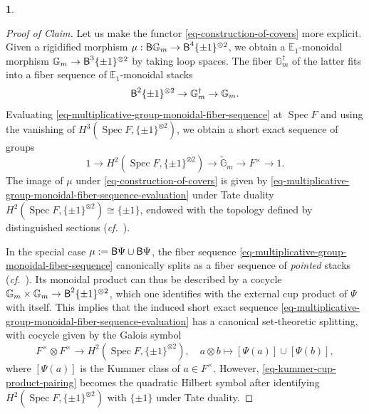 \documentclass[10pt,english,reqno]{amsart}
\newcommand{\deloop}{\textnormal{\textsf{B}}}
\newcommand{\Spec}{\operatorname{Spec}}
\theoremstyle{definition}
\numberwithin{equation}{section}
\newtheorem{untitledsubsubsection}[subsubsection]{}
\newenvironment{void}
{\begin{untitledsubsubsection}}
{\end{untitledsubsubsection}}
\begin{document}
\begin{void}
\begin{proof}[Proof of Claim]
Let us make the functor \eqref{eq-construction-of-covers} more explicit. Given a rigidified morphism $\mu : \deloop \mathbb G_m \rightarrow \deloop^4\{\pm 1\}^{\otimes 2}$, we obtain a $\mathbb E_1$-monoidal morphism $\mathbb G_m \rightarrow \deloop^3\{\pm 1\}^{\otimes 2}$ by taking loop spaces. The fiber $\mathbb G_m^{\dagger}$ of the latter fits into a fiber sequence of $\mathbb E_1$-monoidal stacks
\begin{equation}
\label{eq-multiplicative-group-monoidal-fiber-sequence}
\deloop^2\{\pm 1\}^{\otimes 2} \rightarrow \mathbb G_m^{\dagger} \rightarrow \mathbb G_m.
\end{equation}
Evaluating \eqref{eq-multiplicative-group-monoidal-fiber-sequence} at $\Spec F$ and using the vanishing of $H^3(\Spec F, \{\pm 1\}^{\otimes 2})$, we obtain a short exact sequence of groups
\begin{equation}
\label{eq-multiplicative-group-monoidal-fiber-sequence-evaluation}
1\rightarrow H^2(\Spec F, \{\pm 1\}^{\otimes 2}) \rightarrow \widetilde{\mathbb G}_m \rightarrow F^{\times} \rightarrow 1.
\end{equation}
The image of $\mu$ under \eqref{eq-construction-of-covers} is given by \eqref{eq-multiplicative-group-monoidal-fiber-sequence-evaluation} under Tate duality $H^2(\Spec F, \{\pm 1\}^{\otimes 2}) \cong \{\pm 1\}$, endowed with the topology defined by distinguished sections (\emph{cf.}~\cite[\S2.1.4]{zhao2022metaplectic}).

In the special case $\mu := \deloop\Psi\cup \deloop\Psi$, the fiber sequence \eqref{eq-multiplicative-group-monoidal-fiber-sequence} canonically splits as a fiber sequence of \emph{pointed} stacks (\emph{cf.}~\cite[Proposition 4.4.5]{zhao2022metaplectic}). Its monoidal product can thus be described by a cocycle $\mathbb G_m \times \mathbb G_m \rightarrow \deloop^2\{\pm 1\}^{\otimes 2}$, which one identifies with the external cup product of $\Psi$ with itself. This implies that the induced short exact sequence \eqref{eq-multiplicative-group-monoidal-fiber-sequence-evaluation} has a canonical set-theoretic splitting, with cocycle given by the Galois symbol
\begin{equation}
\label{eq-kummer-cup-product-pairing}
F^{\times} \otimes F^{\times} \rightarrow H^2(\Spec F, \{\pm 1\}^{\otimes 2}),\quad a\otimes b\mapsto [\Psi(a)]\cup[\Psi(b)],
\end{equation}
where $[\Psi(a)]$ is the Kummer class of $a \in F^{\times}$. However, \eqref{eq-kummer-cup-product-pairing} becomes the quadratic Hilbert symbol after identifying $H^2(\Spec F, \{\pm 1\}^{\otimes 2})$ with $\{\pm 1\}$ under Tate duality.
\end{proof}
\end{void}
\end{document}
